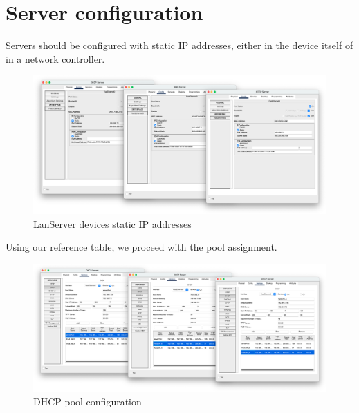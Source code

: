\documentclass[11pt,a4paper]{report}
\begin{document}
    \section{Server configuration}
        Servers should be configured with static IP addresses, either in the device itself of in a network controller.
        \begin{figure}[h]
            \centering
            \includegraphics[scale=0.25]{LanServer-IP}
            \caption{LanServer devices static IP addresses}
            \label{tab:lanserverdev}
        \end{figure}

        Using our reference table, we proceed with the pool assignment.
        \begin{figure}[h]
            \centering
            \includegraphics[scale=0.23]{DHCP-Pool}
            \caption{DHCP pool configuration}
            \label{tab:dhcpconf}
        \end{figure}
\end{document}
